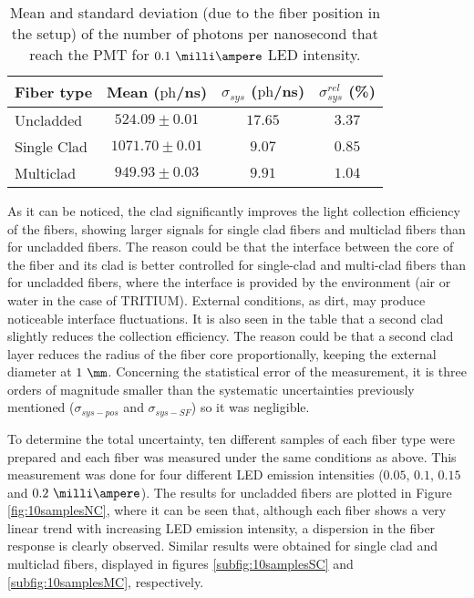 \begin{table}[htbp]
\centering{}%
\begin{tabular}{lccc}
\toprule 
Fiber type & Mean ($\text{ph}$/ns) & $\sigma_{sys}$ ($\text{ph}$/ns) & $\sigma^{rel}_{sys}$ (\%) \tabularnewline
\midrule
\midrule 
Uncladded & $524.09 \pm 0.01$ & $17.65$ & $3.37$ \tabularnewline
Single Clad & $1071.70 \pm 0.01$ & $9.07$ & $0.85$ \tabularnewline
Multiclad & $949.93 \pm 0.03$ & $9.91$ & $1.04$ \tabularnewline
\bottomrule
\end{tabular}
\caption{Mean and standard deviation (due to the fiber position in the setup) of the number of photons per nanosecond that reach the PMT for $0.1~\milli\ampere$ LED intensity.}
\label{tab:PositionStandardDeviation}
\end{table}
As it can be noticed, the clad significantly improves the light collection efficiency of the fibers, showing larger signals for single clad fibers and multiclad fibers than for uncladded fibers. The reason could be that the interface between the core of the fiber and its clad is better controlled for single-clad and multi-clad fibers than for uncladded fibers, where the interface is provided by the environment (air or water in the case of TRITIUM). External conditions, as dirt, may produce noticeable interface fluctuations. It is also seen in the table that a second clad slightly reduces the collection efficiency. The reason could be that a second clad layer reduces the radius of the fiber core proportionally, keeping the external diameter at $1~\mm$. Concerning the statistical error of the measurement, it is three orders of magnitude smaller than the systematic uncertainties previously mentioned ($\sigma_{sys-pos}$ and $\sigma_{sys-SF}$) so it was negligible.


To determine the total uncertainty, ten different samples of each fiber type were prepared and each fiber was measured under the same conditions as above. This measurement was done for four different LED emission intensities ($0.05$, $0.1$, $0.15$ and $0.2~\milli\ampere$). The results for uncladded fibers are plotted in Figure \ref{fig:10samplesNC}, where it can be seen that, although each fiber shows a very linear trend with increasing LED emission intensity, a dispersion in the fiber response is clearly observed. Similar results were obtained for single clad and multiclad fibers, displayed in figures \ref{subfig:10samplesSC} and \ref{subfig:10samplesMC}, respectively.

